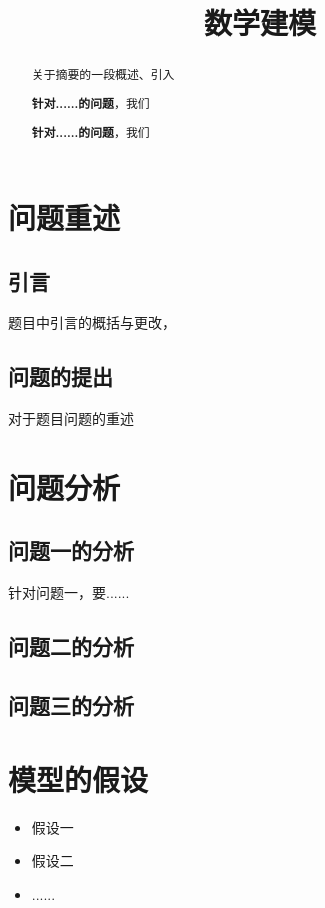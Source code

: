 \documentclass[withoutpreface,bwprint]{cumcmthesis} %
\title{数学建模}
\begin{document}
\maketitle
\begin{abstract}
关于摘要的一段概述、引入

\textbf{针对......的问题}，我们



\textbf{针对......的问题}，我们



\end{abstract}


\section{问题重述}
\subsection{引言}
题目中引言的概括与更改，
\subsection{问题的提出}
对于题目问题的重述


\section{问题分析}
\subsection{问题一的分析}
针对问题一，要......
\subsection{问题二的分析}
\subsection{问题三的分析}





\section{模型的假设}
\begin{itemize}
    \item 假设一
    \item 假设二
    \item ......
\end{itemize}
\end{document}
